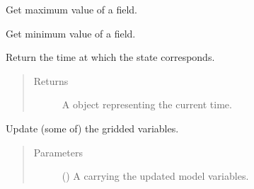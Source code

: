 \documentclass[letterpaper,10pt,english]{sphinxmanual}
\begin{document}
\begin{fulllineitems}
\begin{fulllineitems}
\begin{quote}
\begin{description}
\end{description}\end{quote}

\end{fulllineitems}


\begin{fulllineitems}
\label{\detokenize{api:storages.grid_data.GridData.get_max}}
Get maximum value of a field.

\end{fulllineitems}


\begin{fulllineitems}
\label{\detokenize{api:storages.grid_data.GridData.get_min}}
Get minimum value of a field.

\end{fulllineitems}


\begin{fulllineitems}
\label{\detokenize{api:storages.grid_data.GridData.time}}
Return the time at which the state corresponds.
\begin{quote}\begin{description}
\item[{Returns}] \leavevmode
A  object representing the current time.

\end{description}\end{quote}

\end{fulllineitems}


\begin{fulllineitems}
\label{\detokenize{api:storages.grid_data.GridData.update}}
Update (some of) the gridded variables.
\begin{quote}\begin{description}
\item[{Parameters}] \leavevmode
{} () \textendash{} A {\hyperref[\detokenize{api:storages.grid_data.GridData}]{}} carrying the updated model variables.


\end{description}
\end{quote}
\end{fulllineitems}
\end{fulllineitems}
\end{document}
